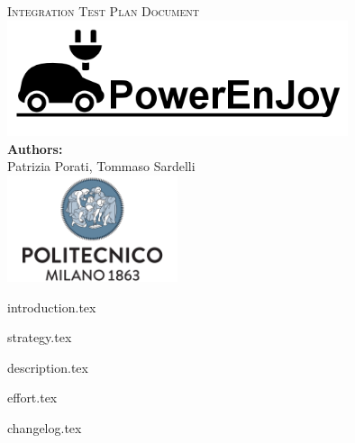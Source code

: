 \documentclass[a4paper,11pt]{article}
\begin{document}
\begin{titlepage}
\begin{center}
\textsc{\LARGE Integration Test Plan Document}\\[1.5cm] %

\includegraphics[width=10cm]{PowerEnJoy.png}\\
 
\vfill
\vfill
\textbf{Authors:}\\
Patrizia Porati, Tommaso Sardelli\\[2.0cm] 


\vfill
\vfill
\includegraphics[width=50mm]{polimi.png}\\
\end{center}
\end{titlepage}

\tableofcontents
\pagebreak


{introduction.tex}

{strategy.tex}


{description.tex}



{effort.tex}

{changelog.tex}
\end{document}
